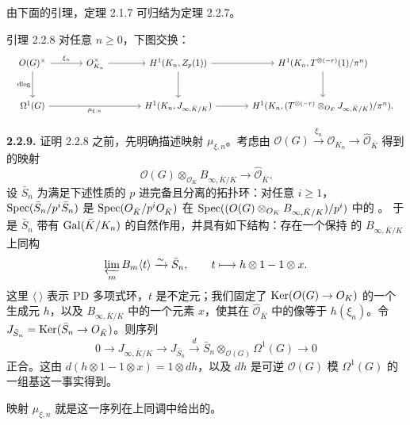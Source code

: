 \providecommand{\kaOG}{\mathcal O(G)}
\providecommand{\kaOm}{\Omega^1(G)}
\providecommand{\kaco}{\operatorname{coLie}(G)}
\providecommand{\kaJ}{J_{\infty,\bar K/K}}
\providecommand{\kaB}{B_{\infty,\bar K/K}}
\providecommand{\kaTr}{\operatorname{Trace}}
由下面的引理，定理 2.1.7 可归结为定理 2.2.7。
\begin{statement}{引理 2.2.8}
对任意 $n\geq0$，下图交换：
\[
\resizebox{\linewidth}{!}{$\begin{tikzcd}[ampersand replacement=\&,column sep=large,row sep=large]
\kaOG^\times\arrow[r,"{\xi_n}"]\arrow[d,"{\mathrm{dlog}}"']\&
\mathcal O_{K_n}^\times\arrow[r]\&H^1(K_n,\mathbb Z_p(1))\arrow[r]\arrow[d]\&
H^1(K_n,T^{\otimes(-r)}(1)/\pi^n)\arrow[d]\\
\kaOm\arrow[rr,"{\mu_{\xi,n}}"']\&\&H^1(K_n,\kaJ)\arrow[r]\&
H^1(K_n,(T^{\otimes(-r)}\otimes_{\mathcal O_F}\kaJ)/\pi^n).
\end{tikzcd}$}
\]
\end{statement}
\noindent\textbf{2.2.9.}
证明 2.2.8 之前，先明确描述映射 $\mu_{\xi,n}$。考虑由
$\kaOG\xrightarrow{\xi_n}\mathcal O_{K_n}\longrightarrow\widehat{\mathcal O}_{\bar K}$
得到的映射
\[
\kaOG\otimes_{\mathcal O_K}\kaB\longrightarrow\widehat{\mathcal O}_{\bar K}.
\]
设 $\bar S_n$ 为满足下述性质的 $p$ 进完备且分离的拓扑环：对任意 $i\geq1$，
$\operatorname{Spec}(\bar S_n/p^i\bar S_n)$ 是
$\operatorname{Spec}(O_{\bar K}/p^iO_{\bar K})$ 在
$\Spec((\kaOG\otimes_{\mathcal O_K}\kaB)/p^i)$ 中的
。
于是 $\bar S_n$ 带有 $\operatorname{Gal}(\bar K/K_n)$ 的自然作用，并具有如下结构：存在一个保持
的 $\kaB$ 上同构
\[
\varprojlim_m B_m\langle t\rangle\xrightarrow{\sim}\bar S_n,
\qquad t\longmapsto h\otimes1-1\otimes x.
\]
这里 $\langle\ \rangle$ 表示 PD 多项式环，$t$ 是不定元；我们固定了
$\Ker(\kaOG\to\mathcal O_K)$ 的一个生成元 $h$，以及 $\kaB$ 中的一个元素 $x$，使其在
$\widehat{\mathcal O}_{\bar K}$ 中的像等于 $h(\xi_n)$。令
$J_{\bar S_n}=\operatorname{Ker}(\bar S_n\to O_{\bar K})$。则序列
\[
0\longrightarrow\kaJ\longrightarrow J_{\bar S_n}
\xrightarrow{d}\bar S_n\otimes_{\kaOG}\kaOm\longrightarrow0
\]
正合。这由 $d(h\otimes1-1\otimes x)=1\otimes dh$，以及 $dh$ 是可逆
$\kaOG$ 模 $\kaOm$ 的一组基这一事实得到。

映射 $\mu_{\xi,n}$ 就是这一序列在上同调中给出的。


